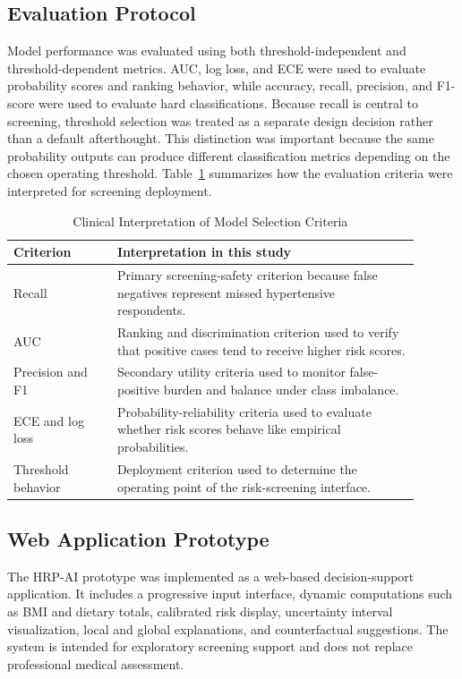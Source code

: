 \documentclass[journal]{IEEEtran}
\begin{document}
\subsection{Evaluation Protocol}
Model performance was evaluated using both threshold-independent and threshold-dependent metrics. AUC, log loss, and ECE were used to evaluate probability scores and ranking behavior, while accuracy, recall, precision, and F1-score were used to evaluate hard classifications. Because recall is central to screening, threshold selection was treated as a separate design decision rather than a default afterthought. This distinction was important because the same probability outputs can produce different classification metrics depending on the chosen operating threshold. Table~\ref{tab:selectioncriteria} summarizes how the evaluation criteria were interpreted for screening deployment.

\begin{table}[!t]
\caption{Clinical Interpretation of Model Selection Criteria}
\label{tab:selectioncriteria}
\centering
\footnotesize
\begin{tabular}{p{0.23\linewidth}p{0.67\linewidth}}
\toprule
Criterion & Interpretation in this study\\
\midrule
Recall & Primary screening-safety criterion because false negatives represent missed hypertensive respondents.\\
AUC & Ranking and discrimination criterion used to verify that positive cases tend to receive higher risk scores.\\
Precision and F1 & Secondary utility criteria used to monitor false-positive burden and balance under class imbalance.\\
ECE and log loss & Probability-reliability criteria used to evaluate whether risk scores behave like empirical probabilities.\\
Threshold behavior & Deployment criterion used to determine the operating point of the risk-screening interface.\\
\bottomrule
\end{tabular}
\end{table}

\subsection{Web Application Prototype}
The HRP-AI prototype was implemented as a web-based decision-support application. It includes a progressive input interface, dynamic computations such as BMI and dietary totals, calibrated risk display, uncertainty interval visualization, local and global explanations, and counterfactual suggestions. The system is intended for exploratory screening support and does not replace professional medical assessment.
\end{document}
